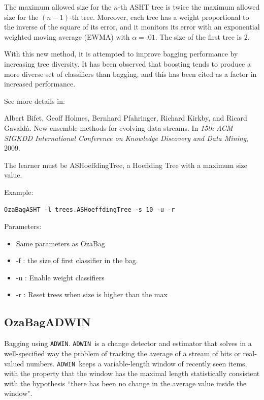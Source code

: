 \documentclass[a4paper,12pt,twoside]{book}
\begin{document}
The maximum allowed size for the $n$-th ASHT tree is
twice the maximum allowed size for the $(n-1)$-th tree. Moreover, each tree
has a weight proportional to the inverse of the square of its error, and
it monitors its error
with an exponential weighted moving average (EWMA) with $\alpha=.01$. The size of the first tree is $2$. 

With this new method, it is attempted to improve bagging performance by increasing tree diversity.
It has been observed that boosting tends to produce a more diverse set of classifiers
than bagging, and this has been cited as a factor in increased performance.

See more details in:

\begin{itemize}
Albert Bifet, Geoff Holmes, Bernhard Pfahringer, Richard Kirkby, and Ricard
  Gavald\`a.
\newblock New ensemble methods for evolving data streams.
\newblock In {\em 15th ACM SIGKDD International Conference on Knowledge
  Discovery and Data Mining}, 2009.
\end{itemize}

The learner must be ASHoeffdingTree, a Hoeffding Tree with a maximum size value.

Example:
\begin{footnotesize}\begin{verbatim}
OzaBagASHT -l trees.ASHoeffdingTree -s 10 -u -r
\end{verbatim}\end{footnotesize}

Parameters:
\begin{itemize}
\item Same parameters as OzaBag
\item -f : the size of first classifier in the bag.
\item -u : Enable weight classifiers
\item -r : Reset trees when size is higher than the max
\end{itemize}

\def\adwin{{\tt ADWIN }}
\def\adwinb{{\tt ADWIN}}
\subsection{OzaBagADWIN} Bagging using \adwinb.
\adwin is a change detector and estimator that solves in a 
well-specified way the problem of tracking the average of a stream of bits or 
real-valued numbers. \adwin keeps a variable-length window of recently seen 
items, with the property that the window has the maximal length statistically 
consistent with the hypothesis ``there has been no change in the average value
inside the window". 
\end{document}
